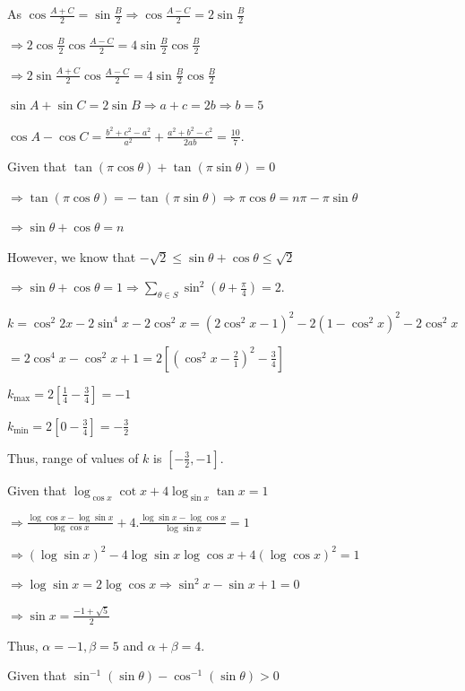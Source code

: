   As $\cos \frac{A + C}{2} = \sin\frac{B}{2}\Rightarrow \cos\frac{A - C}{2} = 2\sin\frac{B}{2}$

  $\Rightarrow 2\cos\frac{B}{2}\cos\frac{A - C}{2} = 4\sin\frac{B}{2}\cos\frac{B}{2}$

  $\Rightarrow 2\sin\frac{A + C}{2}\cos\frac{A - C}{2} = 4\sin\frac{B}{2}\cos\frac{B}{2}$

  $\sin A+ \sin C = 2\sin B\Rightarrow a + c = 2b \Rightarrow b = 5$

  $\cos A - \cos C = \frac{b^2 + c^2 - a^2}{a^2} + \frac{a^2 + b^2 - c^2}{2ab} = \frac{10}{7}$.
\item Given that $\tan(\pi\cos\theta) + \tan(\pi\sin\theta) = 0$

  $\Rightarrow \tan(\pi\cos\theta) = -\tan(\pi\sin\theta)\Rightarrow \pi\cos\theta = n\pi - \pi\sin\theta$

  $\Rightarrow \sin\theta + \cos\theta = n$

  However, we know that $-\sqrt{2} \leq \sin\theta + \cos\theta \leq \sqrt{2}$

  $\Rightarrow \sin\theta + \cos\theta = 1\Rightarrow \displaystyle\sum_{\theta\in S}\sin^2\left(\theta
  + \frac{\pi}{4}\right) = 2$.
\item $k = \cos^{2}2x - 2\sin^4x - 2\cos^2x = \left(2\cos^2x - 1\right)^2 -2\left(1 - \cos^2x\right)^2 -
  2\cos^2x$

  $= 2\cos^4x - \cos^2x + 1 = 2\left[\left(\cos^2x - \frac{2}{1}\right)^2 - \frac{3}{4}\right]$

  $k_{\max} = 2\left[\frac{1}{4} - \frac{3}{4}\right] = -1$

  $k_{\min} = 2\left[0 - \frac{3}{4}\right] = -\frac{3}{2}$

  Thus, range of values of $k$ is $\left[-\frac{3}{2}, -1\right]$.
\item Given that $\log_{\cos x}\cot x + 4\log_{\sin x}\tan x = 1$

  $\Rightarrow \frac{\log \cos x - \log \sin x}{\log \cos x} + 4.\frac{\log \sin x - \log\cos x}{\log\sin x}
  = 1$

  $\Rightarrow (\log\sin x)^2 - 4\log\sin x \log\cos x + 4(\log\cos x)^2 = 1$

  $\Rightarrow \log\sin x  = 2\log\cos x\Rightarrow \sin^2x - \sin x + 1 = 0$

  $\Rightarrow \sin x= \frac{-1 + \sqrt{5}}{2}$

  Thus, $\alpha = -1, \beta = 5$ and $\alpha + \beta = 4$.
\item Given that $\sin^{-1}(\sin\theta) - \cos^{-1}(\sin\theta) > 0$

